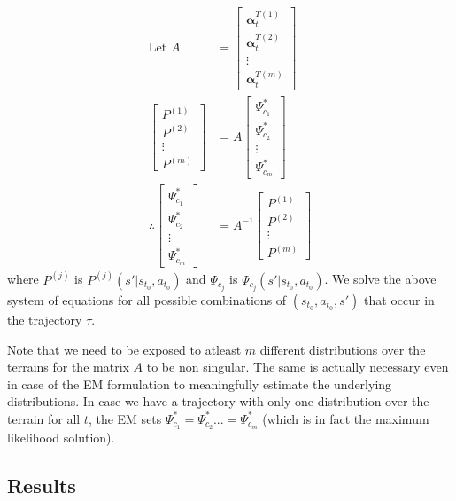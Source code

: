 \documentclass{article}[11pt]
\begin{document}
\begin{align*}
\text{Let }A &= \begin{bmatrix}
\bm{\alpha}_t^{T(1)}\\ \bm{\alpha}_t^{T(2)}\\ \vdots\\ \bm{\alpha}_t^{T(m)}
\end{bmatrix}\\
\begin{bmatrix}
P^{(1)}\\ P^{(2)}\\ \vdots\\ P^{(m)}
\end{bmatrix} &= A \begin{bmatrix}
\Psi^*_{c_1}\\\Psi^*_{c_2}\\ \vdots\\ \Psi^*_{c_m}
\end{bmatrix}\\
\therefore \begin{bmatrix}
\Psi^*_{c_1}\\\Psi^*_{c_2}\\ \vdots\\ \Psi^*_{c_m}
\end{bmatrix} &= A^{-1}\begin{bmatrix}
P^{(1)}\\ P^{(2)}\\ \vdots\\ P^{(m)}
\end{bmatrix}
\end{align*} where $P^{(j)}$ is $P^{(j)}(s'|s_{t_0},a_{t_0})$ and $\Psi_{c_j}$ is $\Psi_{c_j}(s'|s_{t_0},a_{t_0})$. We solve the above system of equations for all possible combinations of $(s_{t_0},a_{t_0},s')$ that occur in the trajectory $\tau$. 

Note that we need to be exposed to atleast $m$ different distributions
over the terrains for the matrix $A$ to be non singular. The same is
actually necessary even in case of the EM formulation to meaningfully
estimate the underlying distributions. In case we have a trajectory
with only one distribution over the terrain for all $t$, the EM sets
$\Psi^*_{c_1} = \Psi^*_{c_2} ... = \Psi^*_{c_m}$ (which is in fact the
maximum likelihood solution).

\subsection{Results}
\end{document}
